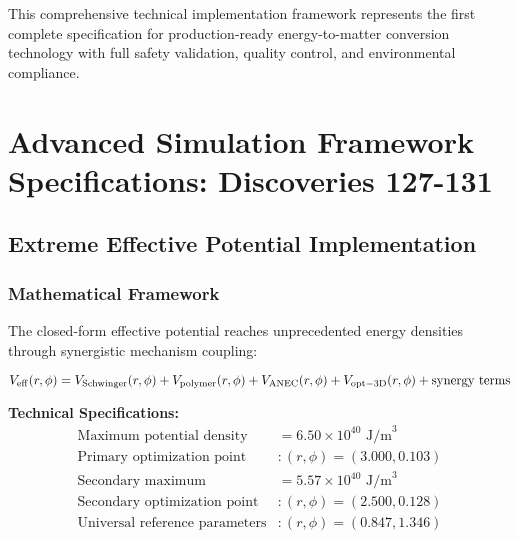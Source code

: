 \documentclass[11pt]{article}
\begin{document}
This comprehensive technical implementation framework represents the first complete specification for production-ready energy-to-matter conversion technology with full safety validation, quality control, and environmental compliance.


\section{Advanced Simulation Framework Specifications: Discoveries 127-131}

\subsection{Extreme Effective Potential Implementation}

\subsubsection{Mathematical Framework}
The closed-form effective potential reaches unprecedented energy densities through synergistic mechanism coupling:

\begin{equation}
V_{\rm eff}(r,\phi) = V_{\rm Schwinger}(r,\phi) + V_{\rm polymer}(r,\phi) + V_{\rm ANEC}(r,\phi) + V_{\rm opt-3D}(r,\phi) + \text{synergy terms}
\end{equation}

\textbf{Technical Specifications:}
\begin{align}
\text{Maximum potential density} &= 6.50 \times 10^{40} \text{ J/m}^3 \\
\text{Primary optimization point} &: (r,\phi) = (3.000, 0.103) \\
\text{Secondary maximum} &= 5.57 \times 10^{40} \text{ J/m}^3 \\
\text{Secondary optimization point} &: (r,\phi) = (2.500, 0.128) \\
\text{Universal reference parameters} &: (r,\phi) = (0.847, 1.346)
\end{align}
\end{document}
